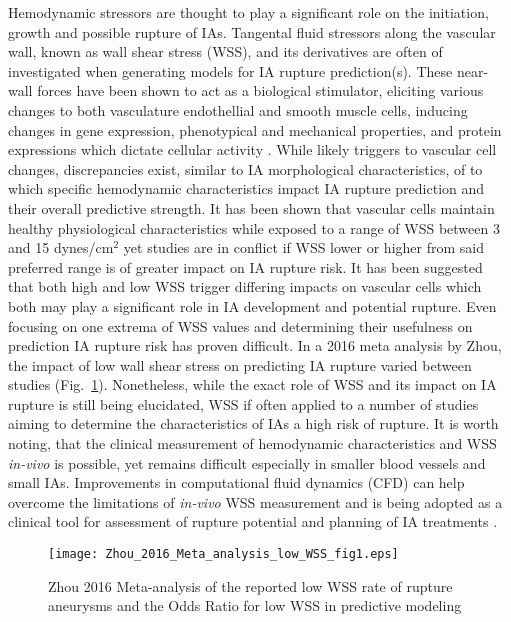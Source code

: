 Hemodynamic stressors are thought to play a significant role on the initiation, growth and possible rupture of IAs. Tangental fluid stressors along the vascular wall, known as wall shear stress (WSS), and its derivatives are often of investigated when generating models for IA rupture prediction(s)\cite{Jing2015,Xiang2011WSS,doddasomayajula2017hemodynamic,Cebral510}. These near-wall forces have been shown to act as a biological stimulator, eliciting various changes to both vasculature endothellial and smooth muscle cells, inducing changes in gene expression, phenotypical and mechanical properties, and protein expressions which dictate cellular activity \cite{baek2009flow,van2010analyzing,dolan2013high,sato2000local,baeyens2016endothelial,byrne2014quantifying,cecchi2011role,kulcsar2011hemodynamics}. While likely triggers to vascular cell changes, discrepancies exist, similar to IA morphological characteristics, of to which specific hemodynamic characteristics impact IA rupture prediction and their overall predictive strength. It has been shown that vascular cells maintain healthy physiological characteristics while exposed to a range of WSS between 3 and 15 dynes/cm$^{2}$ yet studies are in conflict if WSS lower \cite{Miura519,boussel2008aneurysm} or higher \cite{dolan2013high,shojima2004magnitude} from said preferred range is of greater impact on IA rupture risk. It has been suggested that both high and low WSS trigger differing impacts on vascular cells \cite{Meng1254} which both may play a significant role in IA development and potential rupture. Even focusing on one extrema of WSS values and determining their usefulness on prediction IA rupture risk has proven difficult. In a 2016 meta analysis by Zhou, the impact of low wall shear stress on predicting IA rupture varied between studies (Fig.~\ref{Low_WSS_meta_analysis}). Nonetheless, while the exact role of WSS and its impact on IA rupture is still being elucidated, WSS if often applied to a number of studies aiming to determine the characteristics of IAs a high risk of rupture. It is worth noting, that the clinical measurement of hemodynamic characteristics and WSS \textit{in-vivo} is possible, yet remains difficult especially in smaller blood vessels and small IAs. Improvements in computational fluid dynamics (CFD) can help overcome the limitations of \textit{in-vivo} WSS measurement and is being adopted as a clinical tool for assessment of rupture potential and planning of IA treatments \cite{steinman2002image,valen2013mind}. 

\begin{figure}[!h]
\begin{center}
\texttt{[image: Zhou\_2016\_Meta\_analysis\_low\_WSS\_fig1.eps]}
\captionsetup{width=0.5\textwidth, justification=justified,singlelinecheck=false}
\caption{Zhou 2016 Meta-analysis of the reported low WSS rate of rupture aneurysms and the Odds Ratio for low WSS in predictive modeling}
\end{center}
\label{Low_WSS_meta_analysis}
\end{figure}
 

